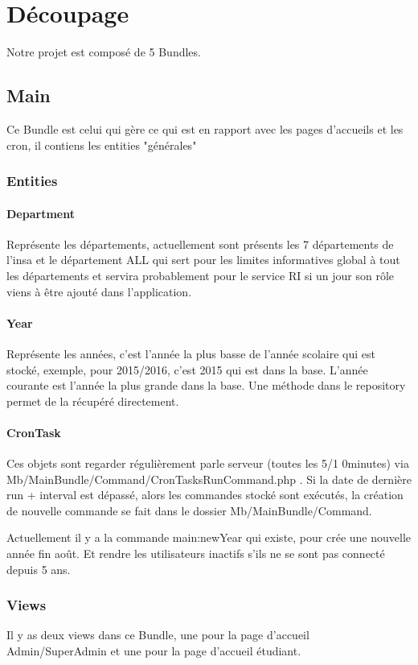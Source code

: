 \chapter{Découpage}
Notre projet est composé de 5 Bundles.

\section{Main}
Ce Bundle est celui qui gère ce qui est en rapport avec les pages d'accueils et les cron, il contiens les entities "générales"

\subsection{Entities}
\subsubsection{Department}
Représente les départements, actuellement sont présents les 7 départements de l'insa et le département ALL qui sert pour les limites informatives global à tout les départements et servira probablement pour le service RI si un jour son rôle viens à être ajouté dans l'application.

\subsubsection{Year}
Représente les années, c'est l'année la plus basse de l'année scolaire qui est stocké, exemple, pour 2015/2016, c'est 2015 qui est dans la base. L'année courante est l'année la plus grande dans la base. Une méthode dans le repository permet de la récupéré directement.

\subsubsection{CronTask}
Ces objets sont regarder régulièrement parle serveur (toutes les 5/1 0minutes) via Mb/MainBundle/Command/CronTasksRunCommand.php . 
Si la date de dernière run + interval est dépassé, alors les commandes stocké sont exécutés, la création de nouvelle commande se fait dans le dossier Mb/MainBundle/Command. 

Actuellement il y a la commande main:newYear qui existe, pour crée une nouvelle année fin août. Et rendre les utilisateurs inactifs s'ils ne se sont pas connecté depuis 5 ans.


\subsection{Views}
Il y as deux views dans ce Bundle, une pour la page d'accueil Admin/SuperAdmin et une pour la page d'accueil étudiant.

